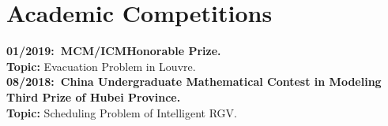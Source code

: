 \documentclass[a4paper]{article}
\begin{document}
\section{Academic Competitions}
\vspace{-0.5em}
\textbf{01/2019:\ MCM/ICM\hspace{2cm}Honorable Prize.}\\
\textbf{Topic:} Evacuation Problem in Louvre.\\
\textbf{08/2018:\ China Undergraduate Mathematical Contest in Modeling\\Third Prize of Hubei Province.}\\
\textbf{Topic:}  Scheduling Problem of Intelligent RGV.


\end{document}

